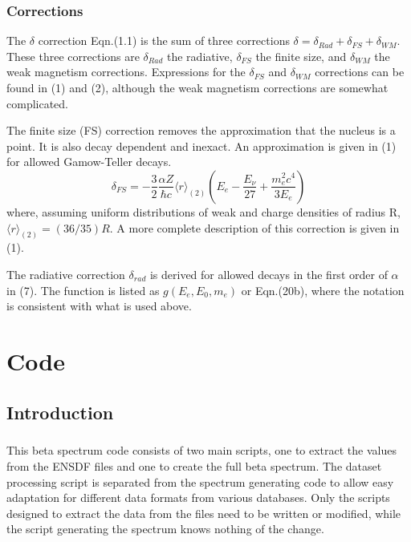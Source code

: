 \documentclass{report}
\begin{document}
\subsection{Corrections}
 The $\delta$ correction Eqn.(1.1) is the sum of three corrections $\delta = \delta_{Rad} + \delta_{FS} + \delta_{WM}$. These three
corrections are $\delta_{Rad}$ the radiative, $\delta_{FS}$ the finite size, and $\delta_{WM}$
the weak magnetism corrections. Expressions for the $\delta_{FS}$ and $\delta_{WM}$ corrections can be found in (1) and (2), although the weak magnetism corrections are somewhat complicated. 

The finite size (FS) correction removes the approximation that the nucleus is a point. It is also decay
dependent and inexact. An approximation is given in (1) for allowed Gamow-Teller decays.
\begin{equation}
\delta_{FS} = - \frac{3}{2} \frac{\alpha Z}{\hbar c} \langle r \rangle _{(2)} \left( E_e - \frac{E_{\nu}}{27} + \frac{m_e^2 c^4}{3E_e}\right)
\end{equation}
where, assuming uniform distributions of weak and charge densities of radius R, $\langle r \rangle _{(2)} = (36/35) R$. 
A more complete description of this correction is given in (1).

The radiative correction $\delta_{rad}$ is derived for allowed decays in the first order of $\alpha$ in (7).
The function is listed as $g(E_e, E_0, m_e)$ or Eqn.(20b), where the notation is consistent with what is used
above.

\chapter{Code}

\section{Introduction}
\paragraph{} 
This beta spectrum code consists of two main scripts, one to extract the values from the ENSDF files and
 one to create the full beta spectrum.
The dataset processing script is separated from the spectrum generating code to allow easy adaptation for different data formats from various databases. 
 Only the scripts designed to extract the data from the files need to be written or modified, while 
 the script generating the spectrum knows nothing of the change.
 
\end{document}

